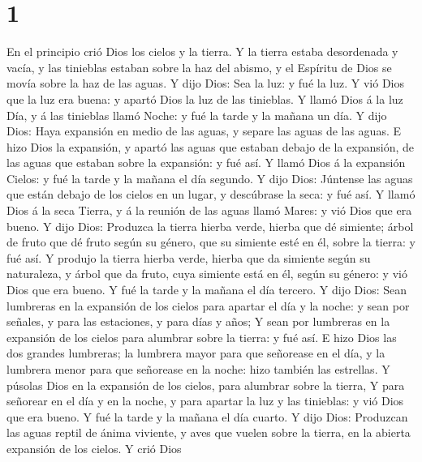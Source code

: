 \hypertarget{section}{%
\section{1}\label{section}}

 En el principio crió Dios los cielos y la tierra.
 Y la tierra estaba desordenada y vacía, y las tinieblas
estaban sobre la haz del abismo, y el Espíritu de Dios se movía sobre la
haz de las aguas.  Y dijo Dios: Sea la luz: y fué la luz.
 Y vió Dios que la luz era buena: y apartó Dios la luz de
las tinieblas.  Y llamó Dios á la luz Día, y á las tinieblas
llamó Noche: y fué la tarde y la mañana un día.  Y dijo
Dios: Haya expansión en medio de las aguas, y separe las aguas de las
aguas.  E hizo Dios la expansión, y apartó las aguas que
estaban debajo de la expansión, de las aguas que estaban sobre la
expansión: y fué así.  Y llamó Dios á la expansión Cielos: y
fué la tarde y la mañana el día segundo.  Y dijo Dios:
Júntense las aguas que están debajo de los cielos en un lugar, y
descúbrase la seca: y fué así.  Y llamó Dios á la seca
Tierra, y á la reunión de las aguas llamó Mares: y vió Dios que era
bueno.  Y dijo Dios: Produzca la tierra hierba verde,
hierba que dé simiente; árbol de fruto que dé fruto según su género, que
su simiente esté en él, sobre la tierra: y fué así.  Y
produjo la tierra hierba verde, hierba que da simiente según su
naturaleza, y árbol que da fruto, cuya simiente está en él, según su
género: y vió Dios que era bueno.  Y fué la tarde y la
mañana el día tercero.  Y dijo Dios: Sean lumbreras en la
expansión de los cielos para apartar el día y la noche: y sean por
señales, y para las estaciones, y para días y años;  Y sean
por lumbreras en la expansión de los cielos para alumbrar sobre la
tierra: y fué así.  E hizo Dios las dos grandes lumbreras;
la lumbrera mayor para que señorease en el día, y la lumbrera menor para
que señorease en la noche: hizo también las estrellas.  Y
púsolas Dios en la expansión de los cielos, para alumbrar sobre la
tierra,  Y para señorear en el día y en la noche, y para
apartar la luz y las tinieblas: y vió Dios que era bueno. 
Y fué la tarde y la mañana el día cuarto.  Y dijo Dios:
Produzcan las aguas reptil de ánima viviente, y aves que vuelen sobre la
tierra, en la abierta expansión de los cielos.  Y crió Dios
